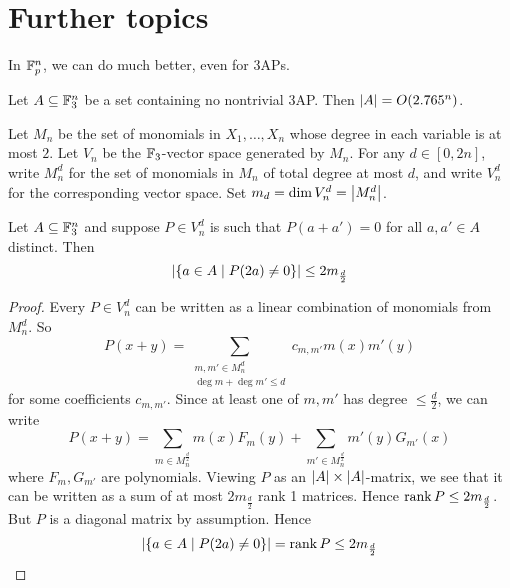 \documentclass{article}
\begin{document}
\newpage

\section{Further topics}

In $\mathbb F_p^n$, we can do much better, even for 3APs.

\begin{thm}
  Let $A \subseteq \mathbb F_3^n$ be a set containing no nontrivial 3AP. Then $\left\lvert A\right\rvert = O(2.765^n)$.
\end{thm}

Let $M_n$ be the set of monomials in $X_1, \dots, X_n$ whose degree in each variable is at most $2$. Let $V_n$ be the $\mathbb F_3$-vector space generated by $M_n$. For any $d \in [0, 2n]$, write $M_n^d$ for the set of monomials in $M_n$ of total degree at most $d$, and write $V_n^d$ for the corresponding vector space. Set $m_d = \dim V_n^d = \left\lvert M_n^d\right\rvert$.

\begin{lem}\label{lem:polynomial-diagonal}
  Let $A \subseteq \mathbb F_3^n$ and suppose $P \in V_n^d$ is such that $P(a + a') = 0$ for all $a, a' \in A$ distinct. Then
  $$\left\lvert \{a \in A \mid P(2a) \ne 0\}\right\rvert \le 2m_{\frac d2}$$
\end{lem}
\begin{proof}
  Every $P \in V_n^d$ can be written as a linear combination of monomials from $M_n^d$. So
  $$P(x + y) = \sum_{\substack{m, m' \in M_n^d \\ \deg m + \deg m' \le d}} c_{m, m'} m(x)m'(y)$$
  for some coefficients $c_{m, m'}$. Since at least one of $m, m'$ has degree $\le \frac d2$, we can write
  $$P(x + y) = \sum_{m \in M_n^{\frac d2}} m(x) F_m(y) + \sum_{m' \in M_n^{\frac d2}} m'(y) G_{m'}(x)$$
  where $F_m, G_{m'}$ are polynomials. Viewing $P$ as an $\left\lvert A\right\rvert \times \left\lvert A\right\rvert$-matrix, we see that it can be written as a sum of at most $2m_{\frac d2}$ rank 1 matrices. Hence $\operatorname{rank} P \le 2m_{\frac d2}$. But $P$ is a diagonal matrix by assumption. Hence
  $$\left\lvert \{a \in A \mid P(2a) \ne 0\}\right\rvert = \operatorname{rank} P \le 2m_{\frac d2}$$
\end{proof}
\end{document}
